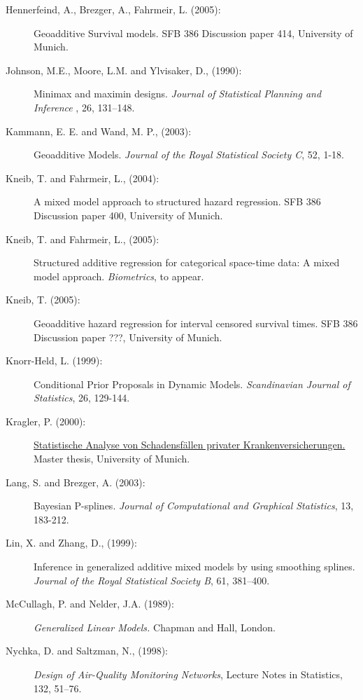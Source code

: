 \documentclass[11pt,a4paper,twoside]{bayesxarticle}
\begin{document}
\begin{description}
\item[Hennerfeind, A., Brezger, A., Fahrmeir, L. (2005):]
Geoadditive Survival models. SFB 386 Discussion paper 414,
University of Munich.

\item[Johnson, M.E., Moore, L.M. and
Ylvisaker, D., (1990):] Minimax and maximin designs. {\it Journal of Statistical Planning and Inference}
, 26, 131--148.

\item[Kammann, E. E. and Wand, M. P., (2003):] Geoadditive Models. {\it Journal of the Royal
Statistical Society C}, 52, 1-18.

\item[Kneib, T. and Fahrmeir, L., (2004):] A mixed model approach
to structured hazard regression. SFB 386 Discussion paper 400,
University of Munich.

\item[Kneib, T. and Fahrmeir, L., (2005):] Structured additive
regression for categorical space-time data: A mixed model approach.
{\it Biometrics}, to appear.

\item[Kneib, T. (2005):] Geoadditive hazard regression for interval
censored survival times. SFB 386 Discussion paper ???, University of
Munich.

\item[Knorr-Held, L. (1999):] Conditional Prior Proposals in
Dynamic Models. {\em Scandinavian Journal of Statistics}, 26,
129-144.

\item[Kragler, P. (2000):] \href{http://www.scor.fr/us/2_laureat.asp?pays=2}
{Statistische Analyse von Schadensf\"allen privater
Krankenversicherungen.} Master thesis, University of Munich.


\item[Lang, S. and Brezger, A. (2003):] Bayesian P-splines. {\it
Journal of Computational and Graphical Statistics}, 13, 183-212.

\item[Lin, X. and Zhang, D., (1999):]
Inference in generalized additive mixed models by using smoothing
splines. {\it Journal of the Royal Statistical Society B}, 61,
381--400.

\item[McCullagh, P. and Nelder, J.A. (1989):] {\em Generalized Linear Models.} Chapman and Hall, London.

\item[Nychka, D. and Saltzman, N., (1998):]
{\it Design of Air-Quality Monitoring Networks},
Lecture Notes in Statistics, 132, 51--76.


\end{description}
\end{document}
